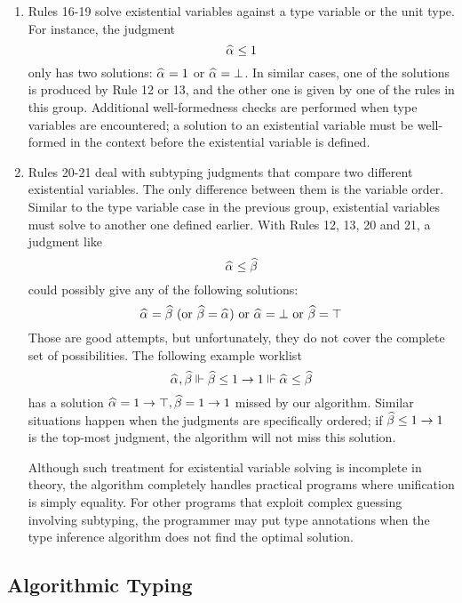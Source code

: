 \begin{enumerate}
    \item Rules 16-19 solve existential variables against a type variable or the unit type.
        For instance, the judgment
        \[\al \le 1\]
        only has two solutions: $\al = 1$ or $\al = \bot$.
        In similar cases, one of the solutions is produced by Rule 12 or 13,
        and the other one is given by one of the rules in this group.
        Additional well-formedness checks are performed when type variables are encountered;
        a solution to an existential variable must be well-formed in the context
        before the existential variable is defined.
    
    \item Rules 20-21 deal with subtyping judgments
        that compare two different existential variables.
        The only difference between them is the variable order.
        Similar to the type variable case in the previous group,
        existential variables must solve to another one defined earlier.
        With Rules 12, 13, 20 and 21, a judgment like
        \[\al \le \bt\]
        could possibly give any of the following solutions:
        \[ \al = \bt ~(\text{or } \bt = \al)
            \text{ or } \al = \bot \text{ or } \bt = \top \]
        Those are good attempts, but unfortunately,
        they do not cover the complete set of possibilities.
        The following example worklist
        \[ \al, \bt \Vdash \bt \le 1 \to 1 \Vdash \al \le \bt \]
        has a solution $\al = 1 \to \top, \bt = 1 \to 1$ missed by our algorithm.
        Similar situations happen when the judgments are specifically ordered;
        if $\bt \le 1 \to 1$ is the top-most judgment,
        the algorithm will not miss this solution.

        Although such treatment for existential variable solving is incomplete in theory,
        the algorithm completely handles practical programs
        where unification is simply equality.
        For other programs that exploit complex guessing involving subtyping,
        the programmer may put type annotations when the type inference algorithm
        does not find the optimal solution.
\end{enumerate}


\subsection{Algorithmic Typing}

